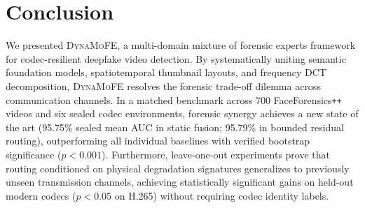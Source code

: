 \documentclass[conference]{IEEEtran}
\newcommand{\dynamofe}{\textsc{DynaMoFE}}
\newcommand{\ffpp}{FaceForensics\texttt{++}}
\newcommand{\auc}{AUC}
\begin{document}
\section{Conclusion}

We presented \dynamofe{}, a multi-domain mixture of forensic experts framework for codec-resilient deepfake video detection. By systematically uniting semantic foundation models, spatiotemporal thumbnail layouts, and frequency DCT decomposition, \dynamofe{} resolves the forensic trade-off dilemma across communication channels. In a matched benchmark across 700 \ffpp{} videos and six sealed codec environments, forensic synergy achieves a new state of the art (95.75\% sealed mean \auc{} in static fusion; 95.79\% in bounded residual routing), outperforming all individual baselines with verified bootstrap significance ($p < 0.001$). Furthermore, leave-one-out experiments prove that routing conditioned on physical degradation signatures generalizes to previously unseen transmission channels, achieving statistically significant gains on held-out modern codecs ($p < 0.05$ on H.265) without requiring codec identity labels.



\end{document}
